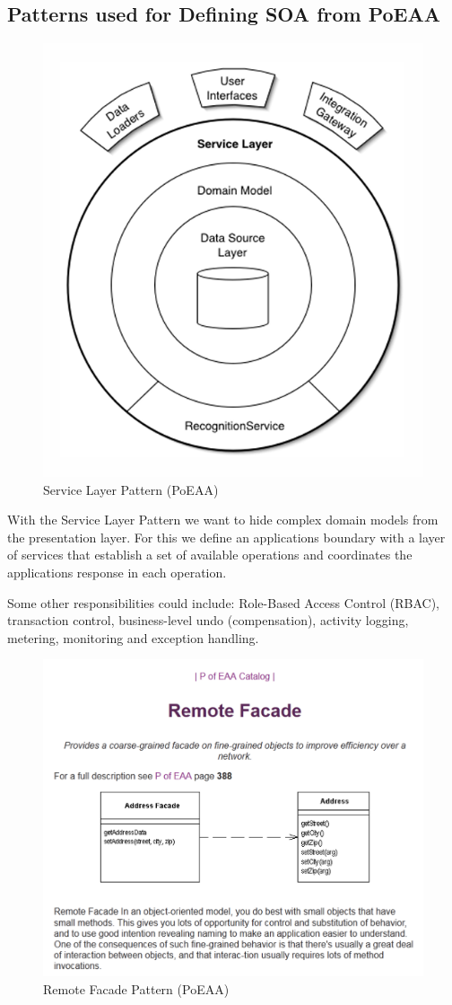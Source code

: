 \documentclass[../Main.tex]{subfiles}
\begin{document}
\subsection{Patterns used for Defining SOA from PoEAA}
\begin{figure}[H]
    \centering
    \includegraphics[width=0.35\linewidth]{Images/service-layer-pattern.png}
    \caption{Service Layer Pattern (PoEAA)}
\end{figure}

With the Service Layer Pattern we want to hide complex domain models from the presentation layer.
For this we define an applications boundary with a layer of services that establish a set of available operations
and coordinates the applications response in each operation.

Some other responsibilities could include: Role-Based Access Control (RBAC), transaction control, business-level undo (compensation),
activity logging, metering, monitoring and exception handling.
\newpage


\begin{figure}[H]
    \centering
    \includegraphics[width=0.6\linewidth]{Images/remote-facade.png}
    \caption{Remote Facade Pattern (PoEAA)}
\end{figure}
\end{document}
